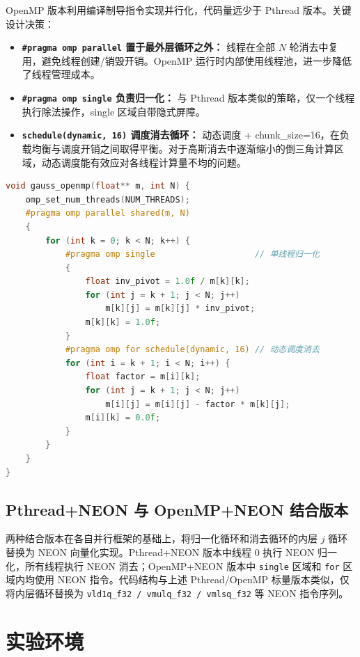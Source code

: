 \documentclass[a4paper]{article}
\begin{document}
OpenMP 版本利用编译制导指令实现并行化，代码量远少于 Pthread 版本。关键设计决策：

\begin{itemize}
    \item \textbf{\texttt{\#pragma omp parallel} 置于最外层循环之外：} 线程在全部 $N$ 轮消去中复用，避免线程创建/销毁开销。OpenMP 运行时内部使用线程池，进一步降低了线程管理成本。
    \item \textbf{\texttt{\#pragma omp single} 负责归一化：} 与 Pthread 版本类似的策略，仅一个线程执行除法操作，single 区域自带隐式屏障。
    \item \textbf{\texttt{schedule(dynamic, 16)} 调度消去循环：} 动态调度 + chunk\_size=16，在负载均衡与调度开销之间取得平衡。对于高斯消去中逐渐缩小的倒三角计算区域，动态调度能有效应对各线程计算量不均的问题。
\end{itemize}

\begin{lstlisting}[title=OpenMP 并行高斯消去,frame=trbl,language={C++}]
void gauss_openmp(float** m, int N) {
    omp_set_num_threads(NUM_THREADS);
    #pragma omp parallel shared(m, N)
    {
        for (int k = 0; k < N; k++) {
            #pragma omp single                    // 单线程归一化
            {
                float inv_pivot = 1.0f / m[k][k];
                for (int j = k + 1; j < N; j++)
                    m[k][j] = m[k][j] * inv_pivot;
                m[k][k] = 1.0f;
            }
            #pragma omp for schedule(dynamic, 16) // 动态调度消去
            for (int i = k + 1; i < N; i++) {
                float factor = m[i][k];
                for (int j = k + 1; j < N; j++)
                    m[i][j] = m[i][j] - factor * m[k][j];
                m[i][k] = 0.0f;
            }
        }
    }
}
\end{lstlisting}

\subsection{Pthread+NEON 与 OpenMP+NEON 结合版本}

两种结合版本在各自并行框架的基础上，将归一化循环和消去循环的内层 $j$ 循环替换为 NEON 向量化实现。Pthread+NEON 版本中线程 0 执行 NEON 归一化，所有线程执行 NEON 消去；OpenMP+NEON 版本中 \texttt{single} 区域和 \texttt{for} 区域内均使用 NEON 指令。代码结构与上述 Pthread/OpenMP 标量版本类似，仅将内层循环替换为 \texttt{vld1q\_f32 / vmulq\_f32 / vmlsq\_f32} 等 NEON 指令序列。

\section{实验环境}
\end{document}
